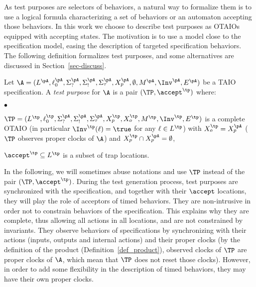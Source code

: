 \documentclass{LMCS}
\theoremstyle{plain}\newtheorem{proposition}[thm]{Proposition}
\begin{document}
As test purposes are selectors of behaviors, 
a natural way to formalize them is to use a logical formula
characterizing a set of behaviors 
or an automaton accepting those behaviors.
In this work we choose to describe test purposes as OTAIOs equipped 
with accepting states.
The motivation is to use a model close to the specification model,
easing the description of targeted specification behaviors.
The following definition formalizes test purposes, 
and some alternatives are discussed in Section~\ref{sec-discuss}. 

\begin{defi}
 Let  $\A=(L^\pA,\ell_0^\pA,\Sigma_?^{\pA},\Sigma_!^{\pA},\Sigma_\tau ^{\pA},
  X_p^\pA,\emptyset, M^\pA,\Inv^\pA,E^\pA)$ be a TAIO specification.
 A {\em test purpose} for $\A$ is a pair
  $(\TP,\accept^\tp)$ where:
\begin{iteMize}{$\bullet$}
\item $\TP=
  (L^\tp,\ell_0^\tp,\Sigma_?^{\pA},\Sigma_!^{\pA},\Sigma_\tau ^{\pA},
  X_p^\tp,X_o^\tp,M^\tp,\Inv^\tp,E^\tp)$ is a complete OTAIO (in
  particular $\Inv^\tp(\ell) = \true$ for any $\ell \in L^\tp$) with
  $X_o^\tp=X_p^\pA$ ($\TP$ observes proper clocks of $\A$) and
  $X_p^\tp\cap X_p^\pA = \emptyset$,
\item
  $\accept^\tp \subseteq L^\tp$ is a subset of trap locations.
\end{iteMize}
\end{defi}

In the following, we will sometimes abuse notations and use $\TP$
instead of the pair $(\TP, \accept^\tp)$.  During the test generation
process, test purposes are synchronized with the specification, and
together with their $\accept$ locations, they will play the role of
acceptors of timed behaviors.  They are non-intrusive in order not to
constrain behaviors of the specification.  This explains why they are
complete, thus allowing all actions in all locations, and are not
constrained by invariants.  They observe behaviors of specifications
by synchronizing with their actions (inputs, outputs and internal
actions) and their proper clocks (by the definition of 
the product (Definition~\ref{def_product}), observed clocks of
$\TP$ are proper clocks of $\A$, which mean that $\TP$ does not reset
those clocks).  However, in order to add some flexibility in the
description of timed behaviors, they may have their own proper clocks.
\end{document}
